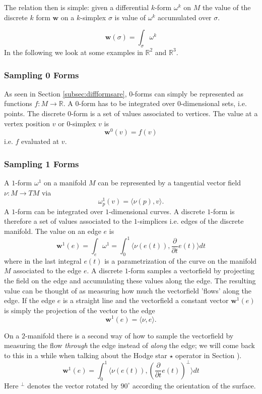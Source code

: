 The relation then is simple: given a differential $k$-form $\omega^k$ on $M$ the value of the discrete $k$ form $\textbf{w}$ on a $k$-simplex $\sigma$ is value of $\omega^k$ accumulated over $\sigma$.

 \[\textbf{w}(\sigma) = \int_\sigma \omega^k\]
In the following we look at some examples in $\mathbb R^2$ and $\mathbb R^3$.

\subsubsection{Sampling 0 Forms}

As seen in Section \ref{subsec:diffformsare}, $0$-forms can simply be represented as functions $f: M\to \mathbb R$. A $0$-form has to be integrated over 0-dimensional sets, i.e. points. The discrete 0-form is a set of values associated to vertices. The value at a vertex position $v$ or 0-simplex $v$
 is
\[\textbf{w}^0(v) = f(v)\]
i.e. $f$ evaluated at $v$.

\subsubsection{Sampling 1 Forms}
A $1$-form $\omega^1$ on a manifold $M$ can be represented by a tangential vector field $\nu:M\to TM$ via 
\[\omega^1_p(v) = \langle\nu(p),v\rangle.\] 
A $1$-form can be integrated over $1$-dimensional curves. A discrete $1$-form is therefore a set of values associated to the $1$-simplices i.e. edges of the discrete manifold. The value on an edge $e$ is
\[\textbf{w}^1(e) = \int_{e} \omega^1 = \int_{0}^1 \langle\nu(e(t)),\frac{\partial}{\partial t}e(t)\rangle dt\]
where in the last integral $e(t)$ is a parametrization of the curve on the manifold $M$ associated to the edge $e$. A discrete $1$-form samples a vectorfield by projecting the field on the edge and accumulating these values along the edge. The resulting value can be thought of as measuring how much the vectorfield 'flows' along the edge. If the edge $e$ is a straight line and the vectorfield a constant vector  $\textbf{w}^1(e)$ is simply the projection of the vector to the edge
\[\textbf{w}^1(e) = \langle \nu, e \rangle.\]

On a $2$-manifold there is a second way of how to sample the vectorfield by measuring the flow \emph{through} the edge instead of \emph{along} the edge; we will come back to this in a while when talking about the Hodge star $\star$ operator in Section \note{[...]}). 
\[\textbf{w}^1(e) = \int_{0}^1 \langle\nu(e(t)),(\frac{\partial}{\partial t}e(t))^\perp \rangle dt\]
Here $^\perp$ denotes the vector rotated by $90^\circ$ according the orientation of the surface.

